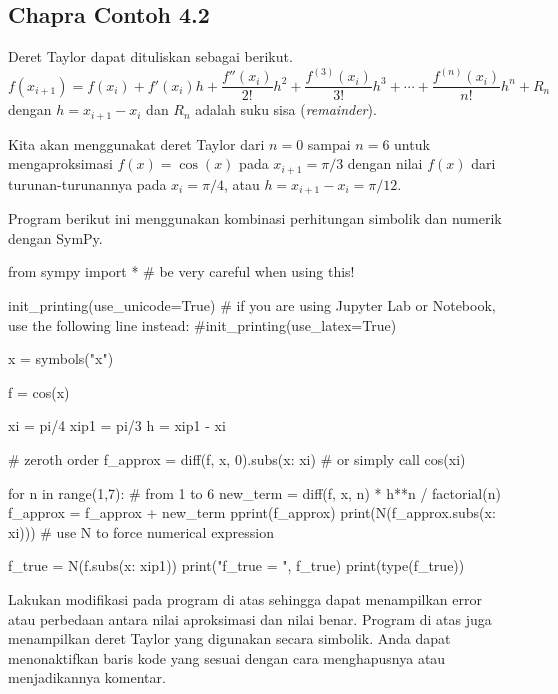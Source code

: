 \subsection{Chapra Contoh 4.2}

Deret Taylor dapat dituliskan sebagai berikut.
\begin{equation}
f(x_{i+1}) = f(x_{i}) + f'(x_{i}) h + \frac{f''(x_{i})}{2!}h^2 + 
\frac{f^{(3)}(x_{i})}{3!}h^3 + \cdots +
\frac{f^{(n)}(x_{i})}{n!}h^n + R_{n}
\end{equation}
dengan $h = x_{i+1} - x_{i}$ dan $R_{n}$ adalah suku sisa (\textit{remainder}).

Kita akan menggunakat deret Taylor dari $n=0$ sampai $n=6$ untuk mengaproksimasi
$f(x) = \cos(x)$ pada $x_{i+1} = \pi/3$ dengan nilai $f(x)$ dari turunan-turunannya
pada $x_{i} = \pi/4$, atau $h = x_{i+1} - x_{i} = \pi/12$.

Program berikut ini menggunakan kombinasi perhitungan simbolik dan numerik
dengan SymPy.
\begin{pythoncode}
from sympy import * # be very careful when using this!

init_printing(use_unicode=True)
# if you are using Jupyter Lab or Notebook, use the following line instead:
#init_printing(use_latex=True)

x = symbols("x")

f = cos(x)

xi = pi/4
xip1 = pi/3
h = xip1 - xi

# zeroth order
f_approx = diff(f, x, 0).subs({x: xi}) # or simply call cos(xi)

for n in range(1,7): # from 1 to 6
    new_term = diff(f, x, n) * h**n / factorial(n)
    f_approx = f_approx + new_term
    pprint(f_approx)
    print(N(f_approx.subs({x: xi}))) # use N to force numerical expression

f_true = N(f.subs({x: xip1}))
print("f_true = ", f_true)
print(type(f_true))
\end{pythoncode}


\begin{soal}
Lakukan modifikasi pada program di atas sehingga dapat menampilkan error atau
perbedaan antara nilai aproksimasi dan nilai benar. Program di atas juga menampilkan
deret Taylor yang digunakan secara simbolik. Anda dapat menonaktifkan baris
kode yang sesuai dengan cara menghapusnya atau menjadikannya komentar.
\end{soal}
